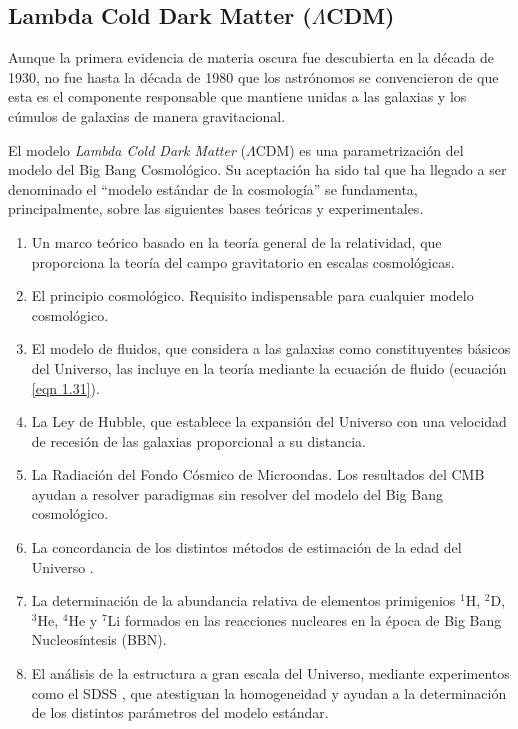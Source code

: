 \documentclass[a4paper,openright,12pt]{book}
\begin{document}



\subsection{Lambda Cold Dark Matter ($\Lambda$CDM)}
Aunque la primera evidencia de materia oscura fue descubierta en la década de 1930, no fue hasta la década de 1980 que los astrónomos se convencieron de que esta es el componente responsable que mantiene unidas a las galaxias y los cúmulos de galaxias de manera gravitacional.

El modelo \textit{Lambda Cold Dark Matter} ($\Lambda$CDM) es una parametrización del modelo del Big Bang Cosmológico. Su aceptación ha sido tal que ha llegado a ser denominado  el ``modelo estándar de la cosmología'' se  fundamenta,  principalmente, sobre las siguientes bases teóricas y experimentales. 
\begin{enumerate}
\item Un marco teórico basado en la teoría general de la relatividad, que proporciona la teoría del campo gravitatorio en escalas cosmológicas.
\item El principio cosmológico. Requisito indispensable para cualquier modelo cosmológico.
\item El modelo de fluidos, que considera a las galaxias como constituyentes básicos del Universo, las incluye en la teoría mediante la ecuación de fluido (ecuación \ref{eqn 1.31}).
\item La Ley de Hubble, que establece la expansión del Universo con una velocidad de recesión de las galaxias proporcional a su distancia.
\item La Radiación del Fondo Cósmico de Microondas. Los resultados del CMB ayudan a resolver paradigmas sin resolver del modelo del Big Bang cosmológico.
\item La concordancia de los distintos métodos de estimación de la edad del Universo \cite{1.1.5}. 
\item La determinación de la abundancia relativa de elementos primigenios $^{1}$H, $^{2}$D, $^{3}$He, $^{4}$He y $^{7}$Li formados en las reacciones nucleares en la época de Big Bang Nucleosíntesis (BBN)\cite{1.1.6, 1.1.7, 1.1.8}.
\item El análisis de la estructura a gran escala del Universo, mediante experimentos como el SDSS \cite{1.1.9} , que atestiguan la homogeneidad y ayudan a la determinación de los distintos parámetros del modelo estándar.

\end{enumerate}
\end{document}
